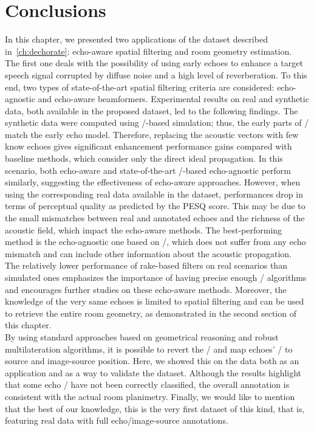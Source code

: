 \section{Conclusions}\label{sec:dechorateapp:conclusion}
In this chapter, we presented two applications of the \dEchorate{} dataset described in~\cref{ch:dechorate}: echo-aware spatial filtering and room geometry estimation.
\\The first one deals with the possibility of using early echoes to enhance a target speech signal corrupted by diffuse noise and a high level of reverberation.
To this end, two types of state-of-the-art spatial filtering criteria are considered: echo-agnostic and echo-aware beamformers.
Experimental results on real and synthetic data, both available in the proposed dataset, led to the following findings.
The synthetic data were computed using \ISM/-based simulation; thus, the early parts of \RIRs/ match the early echo model.
Therefore, replacing the acoustic vectors with few know echoes gives significant enhancement performance gains compared with baseline methods, which consider only the direct ideal propagation.
In this scenario, both echo-aware and state-of-the-art \ReTF/-based echo-agnostic perform similarly, suggesting the effectiveness of echo-aware approaches.
However, when using the corresponding real data available in the dataset, performances drop in terms of perceptual quality as predicted by the \acs{PESQ} score.
This may be due to the small mismatches between real and annotated echoes and the richness of the acoustic field, which impact the echo-aware methods.
The best-performing method is the echo-agnostic one based on \ReTF/, which does not suffer from any echo mismatch and can include other information about the acoustic propagation.
\\The relatively lower performance of rake-based filters on real scenarios than simulated ones emphasizes the importance of having precise enough \AER/ algorithms and encourages further studies on these echo-aware methods.
Moreover, the knowledge of the very same echoes is limited to spatial filtering and can be used to retrieve the entire room geometry, as demonstrated in the second section of this chapter.
\\By using standard approaches based on geometrical reasoning and robust multilateration algorithms, it is possible to revert the \ISM/ and map echoes' \TOAs/ to source and image-source position.
Here, we showed this on the \dEchorate data both as an application and as a way to validate the dataset.
Although the results highlight that some echo \TOAs/ have not been correctly classified, the overall annotation is consistent with the actual room planimetry.
Finally, we would like to mention that the best of our knowledge, this is the very first dataset of this kind, that is, featuring real data with full echo/image-source annotations.

